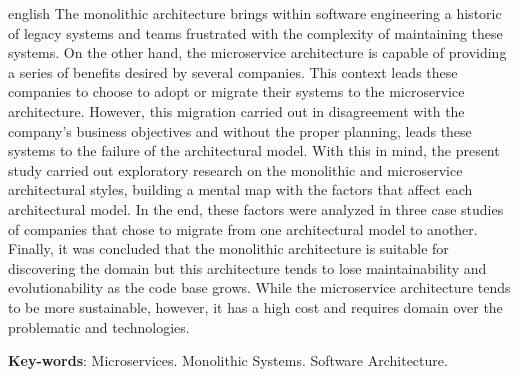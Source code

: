 \begin{resumo}[Abstract]
 \begin{otherlanguage*}{english}
    The monolithic architecture brings within software engineering a historic of
    legacy systems and teams frustrated with the complexity of maintaining these
    systems. On the other hand, the microservice architecture is capable of providing
    a series of benefits desired by several companies. This context leads these companies
    to choose to adopt or migrate their systems to the microservice architecture. However,
    this migration carried out in disagreement with the company's business objectives and
    without the proper planning, leads these systems to the failure of the architectural
    model. With this in mind, the present study carried out exploratory research on the
    monolithic and microservice architectural styles, building a mental map with the
    factors that affect each architectural model. In the end, these factors were analyzed
    in three case studies of companies that chose to migrate from one architectural model
    to another. Finally, it was concluded that the monolithic architecture is suitable for
    discovering the domain but this architecture tends to lose maintainability and
    evolutionability as the code base grows. While the microservice architecture tends to
    be more sustainable, however, it has a high cost and requires domain over the
    problematic and technologies.

   \vspace{\onelineskip}
 
   \noindent 
   \textbf{Key-words}: Microservices. Monolithic Systems. Software Architecture.
 \end{otherlanguage*}
\end{resumo}
